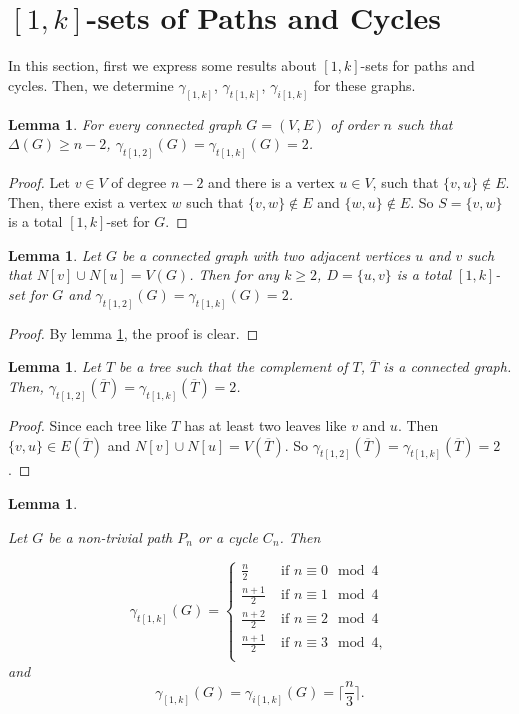 \documentclass[A4,12pt]{article}
\newtheorem{lemma}[theorem]{Lemma}
\theoremstyle{definition}
\theoremstyle{remark}
\begin{document}
	
	\section{$[1,k]$-sets of Paths and Cycles } \label{total}
	In this section, first  we express some results about $[1,k]$-sets for paths and  cycles. Then, we determine $\gamma_{[1, k]}$, $\gamma_{t[1, k]}$,  $\gamma_{i[1, k]}$ for these graphs.
	
	
	
	\begin{lemma}\label{pathlem0}
		For every connected graph $G=(V,E)$  of order $n$ such that $\Delta(G) \geq n-2$, $\gamma_{t[1, 2]}(G)=\gamma_{t[1, k]}(G)=2$.
	\end{lemma}
	\begin{proof}
		Let $v\in V$ of degree $n-2$ and there is a vertex $u\in V$, such that $\{v,u\}\notin E$. Then, there exist a vertex $w$ such that $\{v,w\}\notin E$ and $\{w,u\}\notin E$. So $S=\{v,w\}$ is a total $[1,k]$-set for $G$.
	\end{proof}
	
	
	\begin{lemma}\label{pathlem00}
		Let $G$ be a connected graph with two adjacent vertices $u$ and $v$ such that $N[v]\cup N[u]=V(G)$. Then for any $k\geq 2$,  $D=\{u,v\}$ is a total $[1, k]$-set for $G$ and  $\gamma_{t[1, 2]}(G)= \gamma_{t[1, k]}(G)= 2$.
	\end{lemma}	
	\begin{proof}
		By lemma \ref{pathlem0}, the proof is clear.
	\end{proof}
	\begin{lemma}\label{pathlem000}
		Let $T$ be a tree such that the complement of $T$, $\overline{T}$ is a connected graph.  Then, $\gamma_{t[1, 2]}(\overline{T})=\gamma_{t[1, k]}(\overline{T})=2$.
	\end{lemma}
	\begin{proof}
		Since each tree like $T$ has at least two leaves like $v$ and $u$. Then  $\{v,u\}\in E(\overline{T})$ and  $N[v]\cup N[u]=V(\overline{T})$. So  $\gamma_{t[1, 2]}(\overline{T})=\gamma_{t[1, k]}(\overline{T})=2$.
	\end{proof}
	\begin{lemma}\label{pathlem}
		
		Let $G$ be a non-trivial path $P_n$ or a cycle $C_n$. Then
		
		\begin{equation*}
		\gamma_{t[1, k]}(G) = \left\{
		\begin{array}{ll}
		\frac{n}{2}\; & \text{if } n\equiv 0\mod 4\\
		\frac{n+1}{2}\; & \text{if } n \equiv 1 \mod 4\\
		\frac{n+2}{2}\; & \text{if } n\equiv 2 \mod 4\\
		\frac{n+1}{2}\; & \text{if } n \equiv 3 \mod 4,\\
		\end{array} \right.
		\end{equation*}
		and
		\begin{equation*}
		\gamma_{[1, k]}(G) =\gamma_{i[1, k]}(G)= \lceil \frac{n}{3}\rceil.
		\end{equation*}
	\end{lemma}
	
\end{document}
